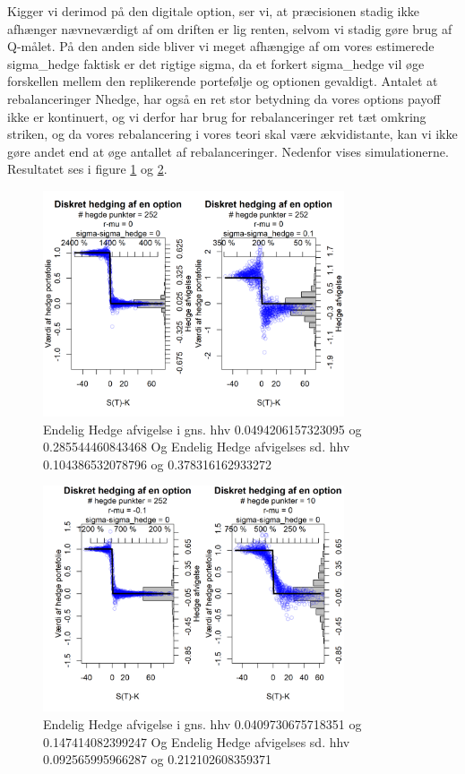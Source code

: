 \documentclass{article}
\theoremstyle{definition}
\theoremstyle{remark}
\begin{document}
Kigger vi derimod på den digitale option, ser vi, at præcisionen stadig ikke afhænger nævneværdigt af om driften er lig renten, selvom vi stadig gøre brug af Q-målet. På den anden side bliver vi meget afhængige af om vores estimerede sigma\_hedge faktisk er det rigtige sigma, da et forkert sigma\_hedge vil øge forskellen mellem den replikerende portefølje og optionen gevaldigt. Antalet at rebalanceringer Nhedge, har også en ret stor betydning da vores options payoff ikke er kontinuert, og vi derfor har brug for rebalanceringer ret tæt omkring striken, og da vores rebalancering i vores teori skal være ækvidistante, kan vi ikke gøre andet end at øge antallet af rebalanceringer. Nedenfor vises simulationerne. Resultatet ses i figure \ref{fig:my_label3} og \ref{fig:my_label2}.
\begin{figure}
    \centering
    \includegraphics[width=3.5in]{Overleaf/3 opttype_standard_sigma.png}
    \caption{Endelig Hedge afvigelse i gns. hhv 0.0494206157323095 og 0.285544460843468 Og Endelig Hedge afvigelses sd. hhv 0.104386532078796 og 0.378316162933272}
    \label{fig:my_label3}
\end{figure}
\begin{figure}
    \centering
    \includegraphics[width=3.5in]{Overleaf/3 opttype_mu_Nhedge.png}
    \caption{Endelig Hedge afvigelse i gns. hhv 0.0409730675718351 og 0.147414082399247 Og Endelig Hedge afvigelses sd. hhv 0.092565995966287 og 0.212102608359371}
    \label{fig:my_label2}
\end{figure}
\end{document}
